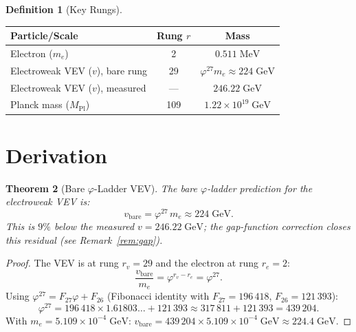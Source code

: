 \documentclass[12pt,a4paper]{article}
\newtheorem{theorem}{Theorem}[section]
\theoremstyle{definition}
\newtheorem{definition}[theorem]{Definition}
\theoremstyle{remark}
\begin{document}
\begin{definition}[Key Rungs]
\begin{center}
\renewcommand{\arraystretch}{1.2}
\begin{tabular}{lcc}
\toprule
\textbf{Particle/Scale} & \textbf{Rung $r$} &
\textbf{Mass} \\
\midrule
Electron ($m_e$) & 2 & $0.511\;\mathrm{MeV}$ \\
Electroweak VEV ($v$), bare rung & 29 &
$\varphi^{27}m_e \approx 224\;\mathrm{GeV}$ \\
Electroweak VEV ($v$), measured & --- & $246.22\;\mathrm{GeV}$ \\
Planck mass ($M_{\mathrm{Pl}}$) & 109 &
$1.22 \times 10^{19}\;\mathrm{GeV}$ \\
\bottomrule
\end{tabular}
\end{center}
\end{definition}

\section{Derivation}
\label{sec:derivation}

\begin{theorem}[Bare $\varphi$-Ladder VEV]
\label{thm:vev}
The bare $\varphi$-ladder prediction for the electroweak VEV is:
\begin{equation}
  \boxed{v_{\mathrm{bare}} = \varphi^{27}\,m_e \approx 224\;\mathrm{GeV}.}
\end{equation}
This is $9\%$ below the measured $v = 246.22\;\mathrm{GeV}$; the
gap-function correction closes this residual (see Remark~\ref{rem:gap}).
\end{theorem}

\begin{proof}
The VEV is at rung $r_v = 29$ and the electron at rung $r_e = 2$:
\[
  \frac{v_{\mathrm{bare}}}{m_e} = \varphi^{r_v - r_e} = \varphi^{27}.
\]
Using $\varphi^{27} = F_{27}\varphi + F_{26}$
(Fibonacci identity with $F_{27} = 196\,418$, $F_{26} = 121\,393$):
\[
  \varphi^{27} = 196\,418 \times 1.61803\ldots + 121\,393
  \approx 317\,811 + 121\,393 = 439\,204.
\]
With $m_e = 5.109 \times 10^{-4}\;\mathrm{GeV}$:
$v_{\mathrm{bare}} = 439\,204 \times 5.109 \times 10^{-4}\;\mathrm{GeV}
\approx 224.4\;\mathrm{GeV}$.
\end{proof}
\end{document}
